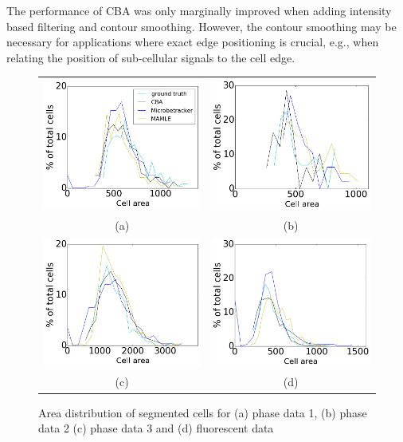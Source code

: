 \documentclass[journal]{IEEEtran}
\begin{document}
The performance of CBA was only marginally improved when adding intensity based filtering and contour smoothing. However, the contour smoothing may be necessary for applications where exact edge positioning is crucial, e.g., when relating the position of sub-cellular signals to the cell edge.

\begin{figure}[!h]
	\centering
	\begin{tabular}{c c }
		\includegraphics[width=0.45\linewidth]{phasdat1areadist.png} & \includegraphics[width=0.45\linewidth]{phasdat2areadist.png} \\
		(a) & (b)\\
		\includegraphics[width=0.45\linewidth]{phasdat3areadist.png}&\includegraphics[width=0.45\linewidth]{fluoareadist.png}\\
		(c) & (d)
	\end{tabular}
	\caption{ Area distribution of segmented cells for (a) phase data 1, (b) phase data 2 (c) phase data 3 and (d) fluorescent data }
	\label{fig:areadistribution}
	
\end{figure}
\end{document}
